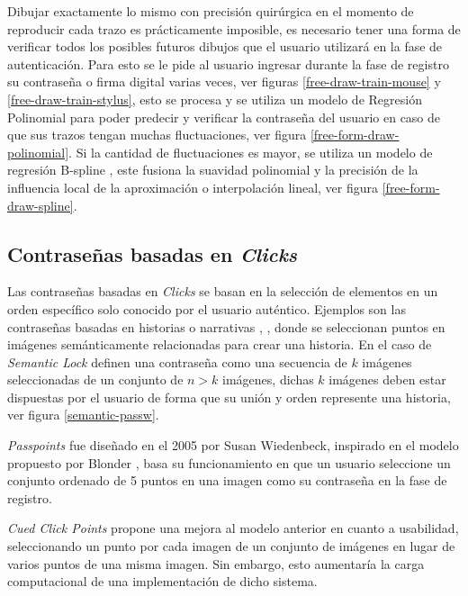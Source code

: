 Dibujar exactamente lo mismo con precisión quirúrgica en el momento de reproducir cada trazo es prácticamente imposible, es necesario tener una forma de verificar todos los posibles futuros dibujos que el usuario utilizará en la fase de autenticación. 
Para esto se le pide al usuario ingresar durante la fase de registro su contraseña o firma digital varias veces, ver figuras \ref{free-draw-train-mouse} y \ref{free-draw-train-stylus}, esto se procesa y se utiliza un modelo de Regresión Polinomial \cite{heiberger2009polynomial} para poder predecir y verificar la contraseña del usuario en caso de que sus trazos tengan muchas fluctuaciones, ver figura \ref{free-form-draw-polinomial}.  Si la cantidad de fluctuaciones es mayor, se utiliza un modelo de regresión B-spline \cite{imoto2000b}, este fusiona la suavidad polinomial y la precisión de la influencia local de la aproximación o interpolación lineal, ver figura \ref{free-form-draw-spline}.





\subsection{Contraseñas basadas en \textit{Clicks}}
Las contraseñas basadas en \textit{Clicks} se basan en la selección de elementos en un orden específico solo conocido por el usuario auténtico. 
Ejemplos son las contraseñas basadas en historias o narrativas \cite{olade2023story}, \cite{hoover2015narrative}, donde se seleccionan puntos en imágenes semánticamente relacionadas para crear una historia. En el caso de  \textit{Semantic Lock} \cite{olade2023story} definen una contraseña como una secuencia de $k$ imágenes seleccionadas de un conjunto de $n > k$ imágenes, dichas $k$ imágenes deben estar dispuestas por el usuario de forma que su unión y orden represente una historia, ver figura \ref{semantic-passw}.

\textit{Passpoints} \cite{wiedenbeck2005passpoints} fue diseñado en el 2005 por Susan Wiedenbeck, inspirado en el modelo propuesto por Blonder \cite{blonder1996graphical}, basa su funcionamiento en que un usuario seleccione un conjunto ordenado de 5 puntos en una imagen como su contraseña en la fase de registro.

\textit{Cued Click Points} \cite{chiasson2007graphical} propone una mejora al modelo anterior en cuanto a usabilidad, seleccionando un punto por cada imagen de un conjunto de imágenes en lugar de varios puntos de una misma imagen. Sin embargo, esto aumentaría la carga computacional de una implementación de dicho sistema.

